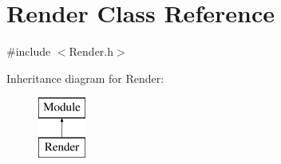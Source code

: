 \hypertarget{class_render}{}\section{Render Class Reference}
\label{class_render}


{\ttfamily \#include $<$Render.\+h$>$}

Inheritance diagram for Render\+:\begin{figure}[H]
\begin{center}
\leavevmode
\includegraphics[height=2.000000cm]{class_render}
\end{center}
\end{figure}
